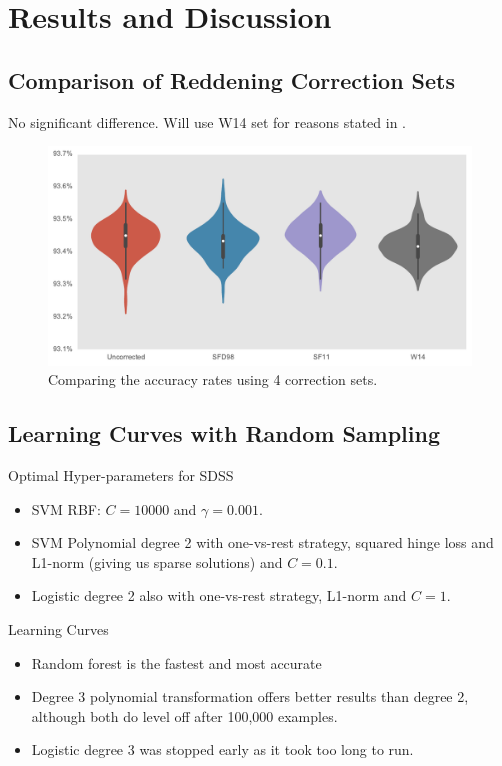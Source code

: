 \section{Results and Discussion}
\label{sec:results1}

\subsection{Comparison of Reddening Correction Sets}
No significant difference. Will use W14 set for reasons stated in \cite{wolf14}.


\begin{figure}[tbp]
	\centering
	\includegraphics[width=\textwidth]{figures/4_expt1/violin_reddening_correction}
	\caption{Comparing the accuracy rates using 4 correction sets.}
	\label{fig:reddeningviolin}
\end{figure}

\subsection{Learning Curves with Random Sampling}
Optimal Hyper-parameters for SDSS
\begin{itemize}
	\item SVM RBF: $C = 10 000$ and $\gamma = 0.001$.
	\item SVM Polynomial degree 2 with one-vs-rest strategy, squared hinge loss and L1-norm
	(giving us sparse solutions) and $C = 0.1$.
	\item Logistic degree 2 also with one-vs-rest strategy, L1-norm and $C=1$.
\end{itemize}
Learning Curves
\begin{itemize}
	\item Random forest is the fastest and most accurate
	\item Degree 3 polynomial transformation offers better results than degree 2, although
	both do level off after 100,000 examples.
	\item Logistic degree 3 was stopped early as it took too long to run.
\end{itemize}



